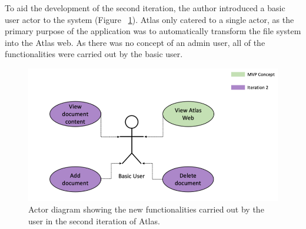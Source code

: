\documentclass{article}
\begin{document}
\begin{table}[]
\centering
\caption{The functional requirements and use cases that defined the second iteration of Atlas.}
\label{tab:my-table}
\end{table}

To aid the development of the second iteration, the author introduced a basic user actor to the system (Figure ~\ref{fig:user}). Atlas only catered to a single actor, as the primary purpose of the application was to automatically transform the file system into the Atlas web. As there was no concept of an admin user, all of the functionalities were carried out by the basic user.

\begin{figure}[!htb]
  \centering
      \includegraphics[width=1\textwidth]{images/actor-diagram.png}
  \caption{Actor diagram showing the new functionalities carried out by the user in the second iteration of Atlas.}
  \label{fig:user}
\end{figure}
\end{document}
